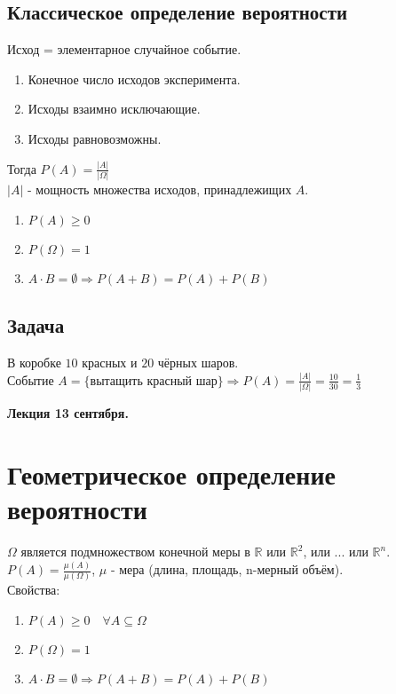\documentclass[12pt, a4paper]{article}
\begin{document}
    \subsection*{Классическое определение вероятности}
    Исход = элементарное случайное событие.
    \begin{enumerate}
        \item Конечное число исходов эксперимента.
        \item Исходы взаимно исключающие.
        \item Исходы равновозможны.
    \end{enumerate}
    Тогда $P(A) = \frac{|A|}{|\Omega|}$\\
    $|A|$ - мощность множества исходов, принадлежищих $A$.
    \begin{enumerate}
        \item $P(A) \geq 0$
        \item $P(\Omega) = 1$
        \item $A\cdot B = \emptyset\Rightarrow P(A + B) = P(A) + P(B)$
    \end{enumerate}
    \subsection*{Задача}
    В коробке $10$ красных и $20$ чёрных шаров.\\
    Событие $A = \{\text{вытащить красный шар}\}\Rightarrow P(A) = \frac{|A|}{|\Omega|} = \frac{10}{30} = \frac{1}{3}$
    \begin{center}
        \bf Лекция 13 сентября.
    \end{center}
    \section*{Геометрическое определение вероятности}
    $\Omega$ является подмножеством конечной меры в $\mathbb{R}$ или $\mathbb{R}^2$, или ... или $\mathbb{R}^n$.
    $P(A) = \frac{\mu(A)}{\mu(\Omega)}$, $\mu$ - мера (длина, площадь, n-мерный объём).\\
    Свойства:
    \begin{enumerate}
        \item $P(A) \geq 0\quad \forall A\subseteq \Omega$
        \item $P(\Omega) = 1$
        \item $A\cdot B = \emptyset\Rightarrow P(A + B) = P(A) + P(B)$
    \end{enumerate}
\end{document}
